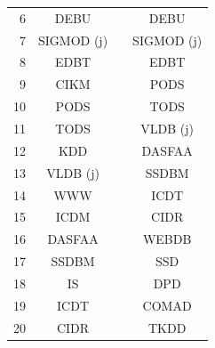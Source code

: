 \begin{table}[htbp]
\begin{tabular}{rccc}
6		&		DEBU		&	&		DEBU		\\
7		&		SIGMOD (j)	&	&		SIGMOD (j)	\\
8		&		EDBT		&	&		EDBT		\\
9		&		CIKM		&	&		PODS		\\
10		&		PODS		&	&		TODS		\\
11		&		TODS		&	&		VLDB (j)	\\
12		&		KDD			&	&		DASFAA		\\
13		&		VLDB (j)	&	&		SSDBM		\\
14		&		WWW			&	&		ICDT		\\
15		&		ICDM		&	&		CIDR		\\
16		&		DASFAA		&	&		WEBDB		\\
17		&		SSDBM		&	&		SSD			\\
18		&		IS			&	&		DPD			\\
19		&		ICDT		&	&		COMAD		\\
20		&		CIDR		&	&		TKDD		\\
\bottomrule
\end{tabular}
\end{table}

